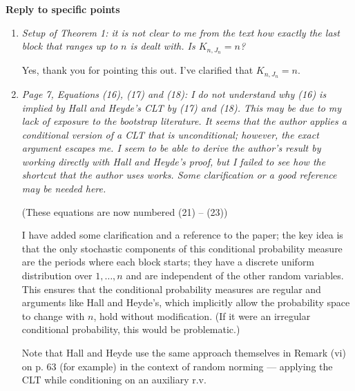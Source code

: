 \documentclass[12pt]{article}
\begin{document}
\newpage

\noindent \textbf{Reply to specific points}

\begin{enumerate}

\item \emph{Setup of Theorem 1: it is not clear to me from the text
    how exactly the last block that ranges up to $n$ is dealt with. Is
    $K_{n,J_n} = n$?}

  Yes, thank you for pointing this out. I've clarified that $K_{n,J_n}
  = n$.

\item \emph{Page 7, Equations (16), (17) and (18): I do not understand
    why (16) is implied by Hall and Heyde's CLT by (17) and (18). This
    may be due to my lack of exposure to the bootstrap literature. It
    seems that the author applies a conditional version of a CLT that
    is unconditional; however, the exact argument escapes me. I seem
    to be able to derive the author's result by working directly with
    Hall and Heyde's proof, but I failed to see how the shortcut that
    the author uses works. Some clarification or a good reference may
    be needed here.}

  (These equations are now numbered (21) -- (23))

  I have added some clarification and a reference to the paper; the
  key idea is that the only stochastic components of this conditional
  probability measure are the periods where each block starts; they
  have a discrete uniform distribution over $1,\dots,n$ and are
  independent of the other random variables. This ensures that the
  conditional probability measures are regular and arguments like Hall
  and Heyde's, which implicitly allow the probability space to change
  with $n$, hold without modification. (If it were an irregular
  conditional probability, this would be problematic.)

  Note that Hall and Heyde use the same approach themselves in Remark
  (vi) on p. 63 (for example) in the context of random norming ---
  applying the CLT while conditioning on an auxiliary r.v.


\end{enumerate}
\end{document}
